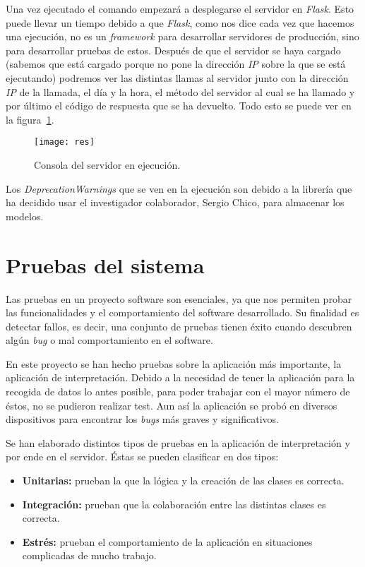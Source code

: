 Una vez ejecutado el comando empezará a desplegarse el servidor en \textit{Flask}. Esto puede llevar un tiempo debido a que \textit{Flask}, como nos dice cada vez que hacemos una ejecución, no es un \textit{framework} para desarrollar servidores de producción, sino para desarrollar pruebas de estos. Después de que el servidor se haya cargado (sabemos que está cargado porque no pone la dirección \textit{IP} sobre la que se está ejecutando) podremos ver las distintas llamas al servidor junto con la dirección \textit{IP} de la llamada, el día y la hora, el método del servidor al cual se ha llamado y por último el código de respuesta que se ha devuelto. Todo esto se puede ver en la figura~\ref{fig:res}.

\begin{figure}
	\centering
	\texttt{[image: res]}
	\caption{Consola del servidor en ejecución.}
	\label{fig:res}
\end{figure}

Los \textit{DeprecationWarnings} que se ven en la ejecución son debido a la librería que ha decidido usar el investigador colaborador, Sergio Chico, para almacenar los modelos.
\section{Pruebas del sistema}
Las pruebas en un proyecto software son esenciales, ya que nos permiten probar las funcionalidades y el comportamiento del software desarrollado. Su finalidad es detectar fallos, es decir, una conjunto de pruebas tienen éxito cuando descubren algún \textit{bug} o mal comportamiento en el software.

En este proyecto se han hecho pruebas sobre la aplicación más importante, la aplicación de interpretación. Debido a la necesidad de tener la aplicación para la recogida de datos lo antes posible, para poder trabajar con el mayor número de éstos, no se pudieron realizar test. Aun así la aplicación se probó en diversos dispositivos para encontrar los \textit{bugs} más graves y significativos.

Se han elaborado distintos tipos de pruebas en la aplicación de interpretación y por ende en el servidor. Éstas se pueden clasificar en dos tipos:
\begin{itemize}
	\item \textbf{Unitarias:} prueban la que la lógica y la creación de las clases es correcta.
	\item \textbf{Integración:} prueban que la colaboración entre las distintas clases es correcta.
	\item \textbf{Estrés:} prueban el comportamiento de la aplicación en situaciones complicadas de mucho trabajo.
\end{itemize}

